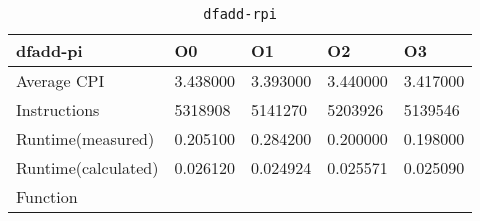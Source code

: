 \begin{table}[ht!]
\centering
\caption{\texttt{dfadd-rpi}}
\label{tab:dfadd-rpi}
\begin{tabular}{|l|l|l|l|l|}
\hline
\textbf{dfadd-pi}	&	\textbf{O0}	&	\textbf{O1}	&	\textbf{O2}	&	\textbf{O3}	\\\hline\hline
Average CPI	&	3.438000	&	3.393000	&	3.440000	&	3.417000	\\\hline
Instructions	&	5318908	&	5141270	&	5203926	&	5139546	\\\hline
Runtime(measured)	&	0.205100	&	0.284200	&	0.200000	&	0.198000	\\\hline
Runtime(calculated)	&	0.026120	&	0.024924	&	0.025571	&	0.025090	\\\hline
Function	&		&		&		&		\\\hline
\end{tabular}
\end{table}
